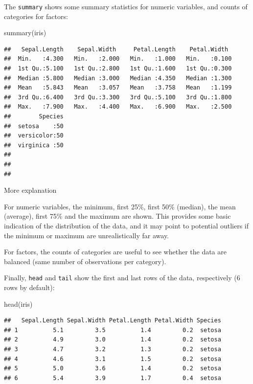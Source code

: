 \documentclass[
]{book}
\newenvironment{Shaded}{\begin{snugshade}}{\end{snugshade}}
\newcommand{\FunctionTok}[1]{\textcolor[rgb]{0.00,0.00,0.00}{#1}}
\newcommand{\NormalTok}[1]{#1}
\begin{document}
The \texttt{summary} shows some summary statistics for numeric variables, and counts of categories for factors:

\begin{Shaded}
\begin{Highlighting}[]
\FunctionTok{summary}\NormalTok{(iris)}
\end{Highlighting}
\end{Shaded}

\begin{verbatim}
##   Sepal.Length    Sepal.Width     Petal.Length    Petal.Width   
##  Min.   :4.300   Min.   :2.000   Min.   :1.000   Min.   :0.100  
##  1st Qu.:5.100   1st Qu.:2.800   1st Qu.:1.600   1st Qu.:0.300  
##  Median :5.800   Median :3.000   Median :4.350   Median :1.300  
##  Mean   :5.843   Mean   :3.057   Mean   :3.758   Mean   :1.199  
##  3rd Qu.:6.400   3rd Qu.:3.300   3rd Qu.:5.100   3rd Qu.:1.800  
##  Max.   :7.900   Max.   :4.400   Max.   :6.900   Max.   :2.500  
##        Species  
##  setosa    :50  
##  versicolor:50  
##  virginica :50  
##                 
##                 
## 
\end{verbatim}

More explanation

For numeric variables, the minimum, first 25\%, first 50\% (median), the mean (average), first 75\% and the maximum are shown. This provides some basic indication of the distribution of the data, and it may point to potential outliers if the minimum or maximum are unrealistically far away.

For factors, the counts of categories are useful to see whether the data are balanced (same number of observations per category).

Finally, \texttt{head} and \texttt{tail} show the first and last rows of the data, respectively (6 rows by default):

\begin{Shaded}
\begin{Highlighting}[]
\FunctionTok{head}\NormalTok{(iris)}
\end{Highlighting}
\end{Shaded}

\begin{verbatim}
##   Sepal.Length Sepal.Width Petal.Length Petal.Width Species
## 1          5.1         3.5          1.4         0.2  setosa
## 2          4.9         3.0          1.4         0.2  setosa
## 3          4.7         3.2          1.3         0.2  setosa
## 4          4.6         3.1          1.5         0.2  setosa
## 5          5.0         3.6          1.4         0.2  setosa
## 6          5.4         3.9          1.7         0.4  setosa
\end{verbatim}
\end{document}
